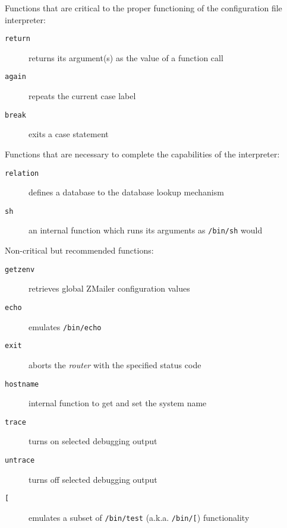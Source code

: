 Functions that are critical to the proper functioning of the configuration
file interpreter:

\begin{description}
\item[{\tt return}] \mbox{}

returns its argument(s) as the value of a function call

\item[{\tt again}] \mbox{}

repeats the current case label

\item[{\tt break}] \mbox{}

exits a case statement

\end{description}


Functions that are necessary to complete the capabilities of the
interpreter:

\begin{description}
\item[{\tt relation}] \mbox{}

defines a database to the database lookup mechanism

\item[{\tt sh}] \mbox{}

an internal function which runs its arguments as {\tt /bin/sh} would

\end{description}


Non-critical but recommended functions:

\begin{description}
\item[{\tt getzenv}] \mbox{}

retrieves global ZMailer configuration values

\item[{\tt echo}] \mbox{}

emulates {\tt /bin/echo}

\item[{\tt exit}] \mbox{}

aborts the {\em router\/} with the specified status code

\item[{\tt hostname}] \mbox{}

internal function to get and set the system name

\item[{\tt trace}] \mbox{}

turns on selected debugging output

\item[{\tt untrace}] \mbox{}

turns off selected debugging output

\item[{\tt [}] \mbox{}

emulates a subset of {\tt /bin/test}
(a.k.a. {\tt /bin/[}) functionality    

\end{description}


